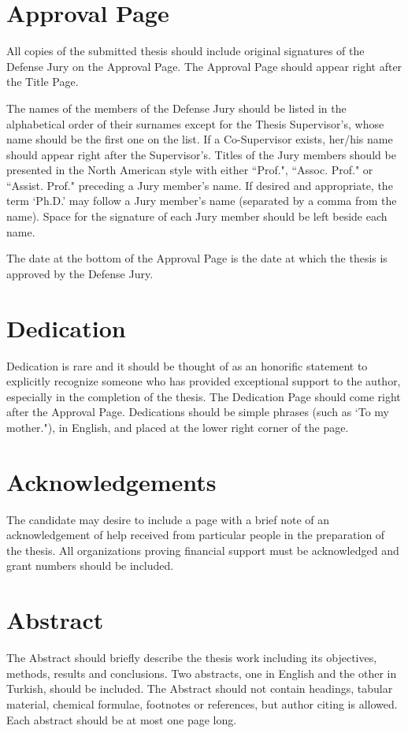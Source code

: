 \documentclass[a4paper,oneside,12pt]{report}
\numberwithin{equation}{chapter}
\begin{document}
\section{Approval Page}
All copies of the submitted thesis should include original signatures
of the Defense Jury on the Approval Page. The Approval Page should appear right after the Title Page.

The names of the members of the Defense Jury
should be listed in the alphabetical order of their surnames except for the
Thesis Supervisor's, whose name should be the first one on the list. If a Co-Supervisor exists, her/his name should appear right after the Supervisor's.
Titles of the Jury members should be presented in the North American
style with either ``Prof.",  ``Assoc. Prof." or ``Assist. Prof." preceding a Jury
member's name. If desired and appropriate, the term `Ph.D.' may follow
a Jury member's name (separated by a comma from the name). Space for the
signature of each Jury member should be left beside each name. 

The date at the bottom of the Approval Page is the date at which the thesis is
approved by the Defense Jury.


\section{Dedication}
Dedication is rare and it should be thought of as an honorific statement to explicitly recognize someone who has provided exceptional support to the author, especially in the completion of the thesis. The Dedication Page should come right after the Approval Page.
Dedications should be simple phrases (such as `To my mother."), in English, and placed at the lower right corner of the page.


\section{Acknowledgements}
The candidate may desire to include a page with a brief note of an
acknowledgement of help received from particular people in the preparation of the thesis. All organizations proving financial support must be acknowledged and
grant numbers should be included. 

\section{Abstract}
The Abstract should briefly describe the thesis work including its objectives, methods, results and conclusions. Two abstracts, one in
English and the other in Turkish, should be included. The Abstract
should not contain headings, tabular material, chemical formulae, footnotes or references, but author citing is allowed. Each abstract should be at most one page long. 
\end{document}
